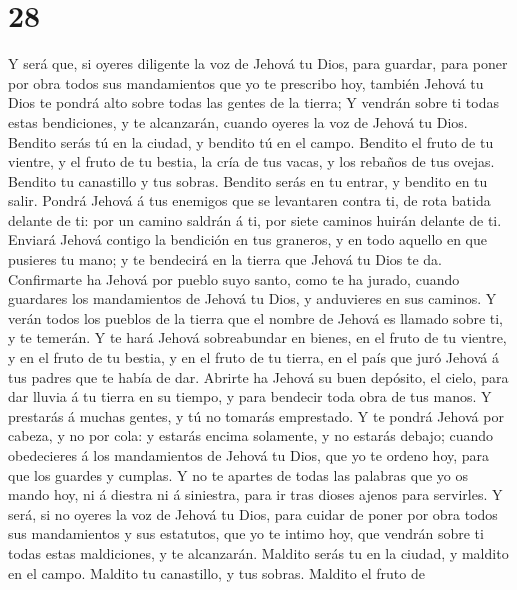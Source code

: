 \hypertarget{section-27}{%
\section{28}\label{section-27}}

 Y será que, si oyeres diligente la voz de Jehová tu Dios,
para guardar, para poner por obra todos sus mandamientos que yo te
prescribo hoy, también Jehová tu Dios te pondrá alto sobre todas las
gentes de la tierra;  Y vendrán sobre ti todas estas
bendiciones, y te alcanzarán, cuando oyeres la voz de Jehová tu Dios.
 Bendito serás tú en la ciudad, y bendito tú en el campo.
 Bendito el fruto de tu vientre, y el fruto de tu bestia, la
cría de tus vacas, y los rebaños de tus ovejas.  Bendito tu
canastillo y tus sobras.  Bendito serás en tu entrar, y
bendito en tu salir.  Pondrá Jehová á tus enemigos que se
levantaren contra ti, de rota batida delante de ti: por un camino
saldrán á ti, por siete caminos huirán delante de ti. 
Enviará Jehová contigo la bendición en tus graneros, y en todo aquello
en que pusieres tu mano; y te bendecirá en la tierra que Jehová tu Dios
te da.  Confirmarte ha Jehová por pueblo suyo santo, como te
ha jurado, cuando guardares los mandamientos de Jehová tu Dios, y
anduvieres en sus caminos.  Y verán todos los pueblos de la
tierra que el nombre de Jehová es llamado sobre ti, y te temerán.
 Y te hará Jehová sobreabundar en bienes, en el fruto de tu
vientre, y en el fruto de tu bestia, y en el fruto de tu tierra, en el
país que juró Jehová á tus padres que te había de dar. 
Abrirte ha Jehová su buen depósito, el cielo, para dar lluvia á tu
tierra en su tiempo, y para bendecir toda obra de tus manos. Y prestarás
á muchas gentes, y tú no tomarás emprestado.  Y te pondrá
Jehová por cabeza, y no por cola: y estarás encima solamente, y no
estarás debajo; cuando obedecieres á los mandamientos de Jehová tu Dios,
que yo te ordeno hoy, para que los guardes y cumplas.  Y no
te apartes de todas las palabras que yo os mando hoy, ni á diestra ni á
siniestra, para ir tras dioses ajenos para servirles.  Y
será, si no oyeres la voz de Jehová tu Dios, para cuidar de poner por
obra todos sus mandamientos y sus estatutos, que yo te intimo hoy, que
vendrán sobre ti todas estas maldiciones, y te alcanzarán. 
Maldito serás tu en la ciudad, y maldito en el campo. 
Maldito tu canastillo, y tus sobras.  Maldito el fruto de
